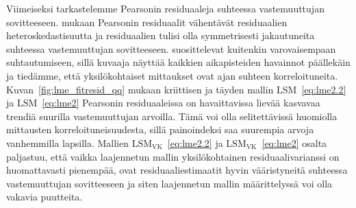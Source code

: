 \documentclass[finnish]{docopts}
\begin{document}
Viimeiseksi tarkastelemme Pearsonin residuaaleja suhteessa vastemuuttujan sovitteeseen. \cite{west14, pinheiro00} mukaan Pearsonin residuaalit vähentävät residuaalien heteroskedastisuutta ja residuaalien tulisi olla symmetrisesti jakautuneita suhteessa vastemuuttujan sovitteeseen. \cite{burzykowski13} suosittelevat kuitenkin varovaisempaan suhtautumiseen, sillä kuvaaja näyttää kaikkien aikapisteiden havainnot päällekäin ja tiedämme, että yksilökohtaiset mittaukset ovat ajan suhteen korreloituneita.\\

Kuvan~\ref{fig:lme_fitresid_qq} mukaan kriittisen ja täyden mallin  $\text{LSM}$~\ref{eq:lme2.2} ja  $\text{LSM}$~\ref{eq:lme2} Pearsonin residuaaleissa on havaittavissa lievää kasvavaa trendiä suurilla vastemuuttujan arvoilla. Tämä voi olla selitettävissä \cite{burzykowski13} huomiolla mittausten korreloituneisuudesta, sillä painoindeksi saa suurempia arvoja vanhemmilla lapsilla. Mallien $\text{LSM}_{\text{VK}}$~\ref{eq:lme2.2} ja $\text{LSM}_{\text{VK}}$~\ref{eq:lme2} osalta paljastuu, että vaikka laajennetun mallin yksilökohtainen residuaalivarianssi on huomattavasti pienempää, ovat residuaaliestimaatit hyvin vääristyneitä suhteessa vastemuuttujan sovitteeseen ja siten laajennetun mallin määrittelyssä voi olla vakavia puutteita.\\
\end{document}
